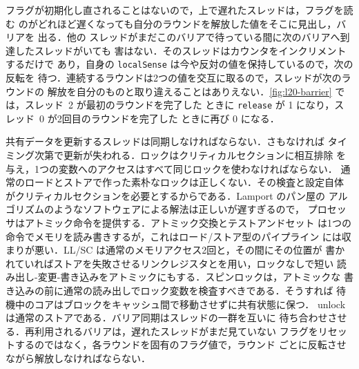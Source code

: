 \documentclass[../main.tex]{subfiles}
\begin{document}
フラグが初期化し直されることはないので，上で遅れたスレッドは，フラグを読む
のがどれほど遅くなっても自分のラウンドを解放した値をそこに見出し，バリアを
出る．他の
スレッドがまだこのバリアで待っている間に次のバリアへ到達したスレッドがいても
害はない．そのスレッドはカウンタをインクリメントするだけで
あり，自身の \texttt{localSense} は今や反対の値を保持しているので，次の反転を
待つ．連続するラウンドは2つの値を交互に取るので，スレッドが次のラウンドの
解放を自分のものと取り違えることはありえない．\cref{fig:l20-barrier} では，スレッド~2 が最初のラウンドを完了した
ときに \texttt{release} が 1 になり，スレッド~0 が2回目のラウンドを完了した
ときに再び 0 になる．

\begin{keypoint}[章のまとめ]
  共有データを更新するスレッドは同期しなければならない．さもなければ
  タイミング次第で更新が失われる．ロックはクリティカルセクションに相互排除
  を与え，1つの変数へのアクセスはすべて同じロックを使わなければならない．
  通常のロードとストアで作った素朴なロックは正しくない．その検査と設定自体
  がクリティカルセクションを必要とするからである．Lamport のパン屋の
  アルゴリズムのようなソフトウェアによる解法は正しいが遅すぎるので，
  プロセッサはアトミック命令を提供する．アトミック交換とテストアンドセット
  は1つの命令でメモリを読み書きするが，これはロード/ストア型のパイプライン
  には収まりが悪い．LL/SC は通常のメモリアクセス2回と，その間にその位置が
  書かれていればストアを失敗させるリンクレジスタとを用い，ロックなしで短い
  読み出し-変更-書き込みをアトミックにもする．スピンロックは，アトミックな
  書き込みの前に通常の読み出しでロック変数を検査すべきである．そうすれば
  待機中のコアはブロックをキャッシュ間で移動させずに共有状態に保つ．
  unlock は通常のストアである．バリア同期はスレッドの一群を互いに
  待ち合わせさせる．再利用されるバリアは，遅れたスレッドがまだ見ていない
  フラグをリセットするのではなく，各ラウンドを固有のフラグ値で，ラウンド
  ごとに反転させながら解放しなければならない．
\end{keypoint}
\end{document}
